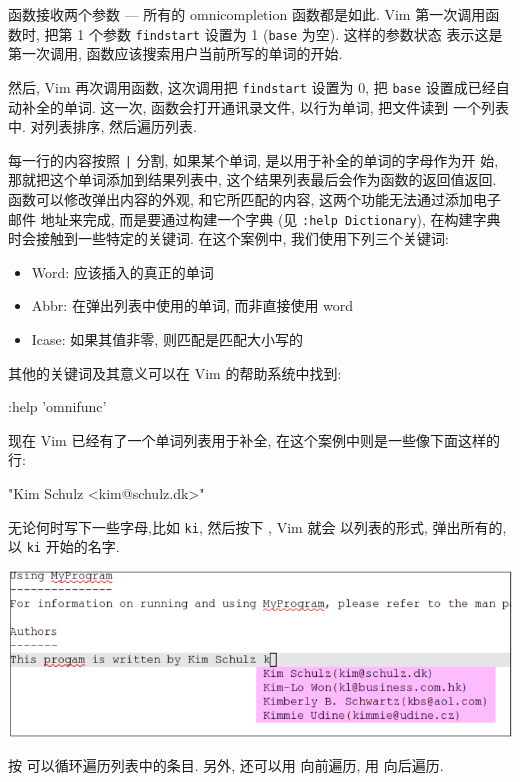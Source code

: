 函数接收两个参数 --- 所有的 omnicompletion 函数都是如此. Vim 第一次调用函数时,
把第 1 个参数 \texttt{findstart} 设置为 1 (\texttt{base} 为空). 这样的参数状态
表示这是第一次调用, 函数应该搜索用户当前所写的单词的开始.

然后, Vim 再次调用函数, 这次调用把 \texttt{findstart} 设置为 0, 把 \texttt{base}
设置成已经自动补全的单词. 这一次, 函数会打开通讯录文件, 以行为单词, 把文件读到
一个列表中. 对列表排序, 然后遍历列表.

每一行的内容按照 \texttt{|} 分割, 如果某个单词, 是以用于补全的单词的字母作为开
始, 那就把这个单词添加到结果列表中, 这个结果列表最后会作为函数的返回值返回.
函数可以修改弹出内容的外观, 和它所匹配的内容, 这两个功能无法通过添加电子邮件
地址来完成, 而是要通过构建一个字典 (见 \texttt{:help Dictionary}), 在构建字典
时会接触到一些特定的关键词. 在这个案例中, 我们使用下列三个关键词:
\begin{itemize}
    \item Word: 应该插入的真正的单词
    \item Abbr: 在弹出列表中使用的单词, 而非直接使用 word
    \item Icase: 如果其值非零, 则匹配是匹配大小写的
\end{itemize}

其他的关键词及其意义可以在 Vim 的帮助系统中找到:
\begin{vimcode}
:help 'omnifunc'
\end{vimcode}

现在 Vim 已经有了一个单词列表用于补全, 在这个案例中则是一些像下面这样的行:
\begin{vimcode}
"Kim Schulz <kim@schulz.dk>"
\end{vimcode}
无论何时写下一些字母,比如 \texttt{ki}, 然后按下 , Vim 就会 
以列表的形式, 弹出所有的, 以 \texttt{ki} 开始的名字.
\begin{center}
    \includegraphics[scale=0.6]{./images/page89.png}
\end{center}
按  可以循环遍历列表中的条目. 另外, 还可以用  向前遍历,
用  向后遍历.

